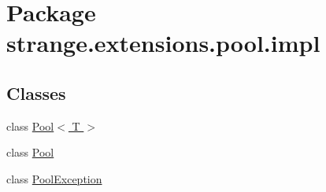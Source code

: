 \hypertarget{namespacestrange_1_1extensions_1_1pool_1_1impl}{\section{Package strange.\-extensions.\-pool.\-impl}
\label{namespacestrange_1_1extensions_1_1pool_1_1impl}
}
\subsection*{Classes}
\begin{DoxyCompactItemize}
\item 
class \hyperlink{classstrange_1_1extensions_1_1pool_1_1impl_1_1_pool_3_01_t_01_4}{Pool$<$ T $>$}
\item 
class \hyperlink{classstrange_1_1extensions_1_1pool_1_1impl_1_1_pool}{Pool}
\item 
class \hyperlink{classstrange_1_1extensions_1_1pool_1_1impl_1_1_pool_exception}{Pool\-Exception}
\end{DoxyCompactItemize}
